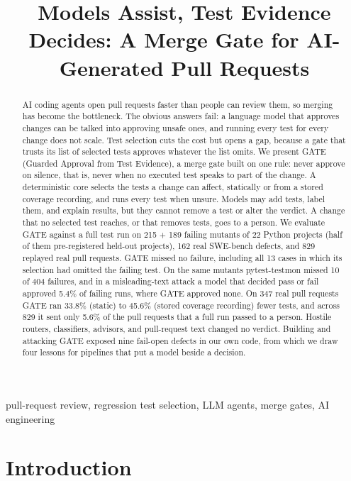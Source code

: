\documentclass[conference]{IEEEtran}
\begin{document}
\title{Models Assist, Test Evidence Decides: A Merge Gate for AI-Generated Pull Requests}
\author{}
\maketitle
\begin{abstract}
AI coding agents open pull requests faster than people can review them, so merging has become the bottleneck. The obvious answers fail: a language model that approves changes can be talked into approving unsafe ones, and running every test for every change does not scale. Test selection cuts the cost but opens a gap, because a gate that trusts its list of selected tests approves whatever the list omits. We present GATE (Guarded Approval from Test Evidence), a merge gate built on one rule: never approve on silence, that is, never when no executed test speaks to part of the change. A deterministic core selects the tests a change can affect, statically or from a stored coverage recording, and runs every test when unsure. Models may add tests, label them, and explain results, but they cannot remove a test or alter the verdict. A change that no selected test reaches, or that removes tests, goes to a person. We evaluate GATE against a full test run on 215 + 189 failing mutants of 22 Python projects (half of them pre-registered held-out projects), 162 real SWE-bench defects, and 829 replayed real pull requests. GATE missed no failure, including all 13 cases in which its selection had omitted the failing test. On the same mutants pytest-testmon missed 10 of 404 failures, and in a misleading-text attack a model that decided pass or fail approved 5.4\% of failing runs, where GATE approved none. On 347 real pull requests GATE ran 33.8\% (static) to 45.6\% (stored coverage recording) fewer tests, and across 829 it sent only 5.6\% of the pull requests that a full run passed to a person. Hostile routers, classifiers, advisors, and pull-request text changed no verdict. Building and attacking GATE exposed nine fail-open defects in our own code, from which we draw four lessons for pipelines that put a model beside a decision.
\end{abstract}
\begin{IEEEkeywords}
pull-request review, regression test selection, LLM agents, merge gates, AI engineering
\end{IEEEkeywords}
\setcounter{section}{0}
\setcounter{table}{0}
\setcounter{figure}{0}
\section{Introduction}\label{introduction}
\end{document}
